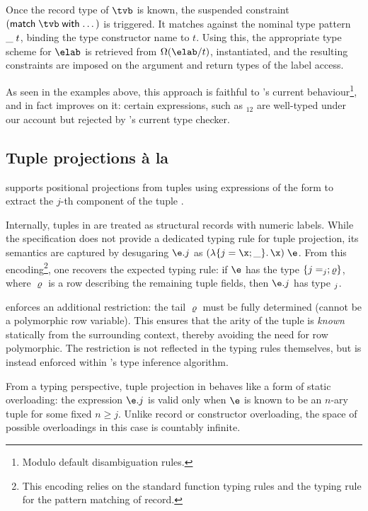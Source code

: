 \documentclass[acmsmall,screen,nonacm,review]{acmart}
\begin{document}
Once the record type of $\tvb$ is known, the suspended constraint $(\cmatchdots
\tvb)$ is triggered. It matches against the nominal type pattern ${\_} \mathrel{t}\mathclose{}$,
binding the type constructor name to $t$. Using this, the appropriate type
scheme for $\elab$ is retrieved from $\labenv(\elab/t)$, instantiated, and the
resulting constraints are imposed on the argument and return types of the label
access.


As seen in the examples above, this approach is faithful to \OCaml's current
behaviour\footnote {Modulo default disambiguation rules.}, and in fact
improves on it: certain expressions, such as $_{12}$ are well-typed
under our account but rejected by \OCaml's current type checker.

\subsection{Tuple projections \`a la \SML}

\SML supports positional projections from tuples using expressions of the form
 to extract the $j$-th component of the tuple .


Internally, tuples in \SML are treated as structural records with numeric
labels. While the specification \cite{TODO} does not provide a dedicated typing
rule for tuple projection, its semantics are captured by desugaring $\eproj \e
j$ as $\eapp {\parens {\efun {\erecord {j = \x; \wild}} \x}} \e$. From this
encoding\footnote{This encoding relies on the standard function typing rules
and the \SML typing rule for the pattern matching of record.}, one recovers the
expected typing rule: if $\e$ has the type $\{j = \relax_j; \varrho\}$,
where $\varrho$ is a row describing the remaining tuple fields, then $\eproj \e
j$ has type $\relax_j$.

\SML enforces an additional restriction: the tail $\varrho$ must be fully
determined (\ie cannot be a polymorphic row variable).  This ensures that the
arity of the tuple is \emph{known} statically from the surrounding context,
thereby avoiding the need for row polymorphic. The restriction is not reflected
in the typing rules themselves, but is instead enforced within \SML's type
inference algorithm.


From a typing perspective, tuple projection in \SML behaves like a form
of static overloading: the expression $\eproj \e j$ is valid only when $\e$ is
known to be an $n$-ary tuple for some fixed $n \geq j$. Unlike record or
constructor  overloading, the space of possible overloadings in this case is
countably infinite.
\end{document}
